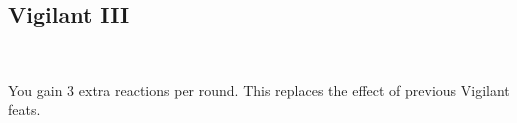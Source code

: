 \subsection*{Vigilant III}\label{feat:vigilant3}
 \\

You gain 3 extra reactions per round. This replaces the effect
of previous Vigilant feats.
